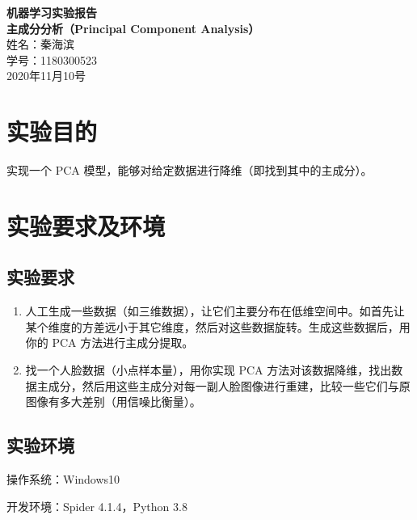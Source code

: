 \documentclass[12pt]{article}
\begin{document}
 
\begin{titlepage}
\begin{center}      
{\Huge \bfseries 机器学习实验报告}\\[1cm]
{\Large \bfseries 主成分分析（Principal Component Analysis）}\\[10cm]
{\Large 姓名：秦海滨}\\[1cm]
{\Large 学号：1180300523}\\[8cm]
{\Large 2020年11月10号}
\end{center}
\end{titlepage}
\newpage
\tableofcontents
\newpage
\section{实验目的}
实现一个 PCA 模型，能够对给定数据进行降维（即找到其中的主成分）。\par
\section{实验要求及环境}
\subsection{实验要求}
\begin{enumerate}
    \item 人工生成一些数据（如三维数据），让它们主要分布在低维空间中。如首先让某个维度的方差远小于其它维度，然后对这些数据旋转。生成这些数据后，用你的 PCA 方法进行主成分提取。\par
    \item 找一个人脸数据（小点样本量），用你实现 PCA 方法对该数据降维，找出数据主成分，然后用这些主成分对每一副人脸图像进行重建，比较一些它们与原图像有多大差别（用信噪比衡量）。\par
\end{enumerate}
\subsection{实验环境}
\noindent 操作系统：Windows10 \par
\noindent 开发环境：Spider 4.1.4，Python 3.8 \par
\end{document}
